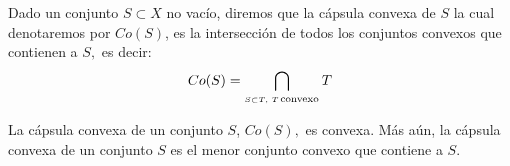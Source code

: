 % 
% 
% 
% 
% 
% 
% 
% 
% 


{ Dado un conjunto $S \subset X$ no vac\'io, diremos que la c\'apsula convexa de $S$ la cual
denotaremos por $Co(S)$, es la intersecci\'on de todos los conjuntos convexos que contienen a $S,$ es decir:
\[Co(S) = \bigcap_{_{S \subset T,\,\, T\, \mbox{\scriptsize convexo}}} T\] \label{cap-convx} }
\medskip

La c\'apsula convexa de un conjunto $S$, $Co(S),$ es convexa. M\'as a\'un, la c\'apsula convexa de un conjunto $S$ es el menor conjunto
convexo que contiene a $S$.\\
\medskip

